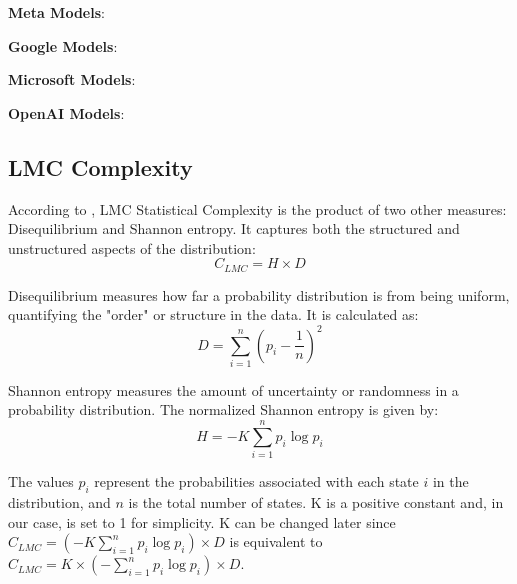 \begin{tcolorbox}[colback=gray!10, colframe=black, boxrule=1pt, rounded corners]
    \textbf{Meta Models}:
    \cite{MetaLlama4Scout}
    \cite{MetaLlama3.2-3B}
    \cite{MetaLlama3.2-1B}
    \cite{MetaLlama3.1-70B}
    \cite{MetaLlama3.1-8B}
    \cite{MetaLlama3-70B}
    \cite{MetaLlama3-8B}
    \cite{MetaLlama2-70b}
    \cite{MetaLlama2-13b}
    \cite{MetaLlama2-7b}

    \textbf{Google Models}:
    \cite{GoogleGemma3-27b}
    \cite{GoogleGemma3-12b}
    \cite{GoogleGemma3-4b}
    \cite{GoogleGemma3-1b}
    \cite{GoogleGemma2-27b}
    \cite{GoogleGemma2-9b}
    \cite{GoogleGemma2-2b}
    \cite{GoogleGemma-7b}
    \cite{GoogleGemma-2b}
    \cite{GoogleRecurrentGemma-9b}
    \cite{GoogleRecurrentGemma-2b}

    \textbf{Microsoft Models}:
    \cite{MicrosoftPhi4-mini-reasoning}
    \cite{MicrosoftPhi4-reasoning}
    \cite{MicrosoftPhi4-reasoning-plus}
    \cite{MicrosoftPhi4}
    \cite{MicrosoftPhi2}
    \cite{MicrosoftPhi1-5}
    \cite{MicrosoftPhi1}

    \textbf{OpenAI Models}:
    \cite{OpenAIGPT-oss-120b}
    \cite{OpenAIGPT-oss-20b}
    \cite{OpenAIGPT2-xl}
    \cite{OpenAIGPT2-large}
    \cite{OpenAIGPT2-medium}
    \cite{OpenAIGPT2}
\end{tcolorbox}

\subsection{LMC Complexity}
\label{sec:lmc_complexity}

    According to \cite{LopezRuiz1995}, LMC Statistical Complexity is the product of two other measures: Disequilibrium and Shannon entropy. It captures both the structured and unstructured aspects of the distribution:
    \[ C_{LMC} = H \times D \]

    Disequilibrium measures how far a probability distribution is from being uniform, quantifying the "order" or structure in the data. It is calculated as:
    \[ D = \sum_{i=1}^{n} \left(p_i - \frac{1}{n}\right)^2 \]

    Shannon entropy measures the amount of uncertainty or randomness in a probability distribution. The normalized Shannon entropy is given by:
    \[ H = -K \sum_{i=1}^{n} p_i \log p_i \]

    The values \( p_i \) represent the probabilities associated with each state \( i \) in the distribution, and \( n \) is the total number of states. K is a positive constant and, in our case, is set to 1 for simplicity. K can be changed later since \( C_{LMC} = (-K \sum_{i=1}^{n} p_i \log p_i)  \times D \) is equivalent to \( C_{LMC} = K \times (- \sum_{i=1}^{n} p_i \log p_i)  \times D \).

